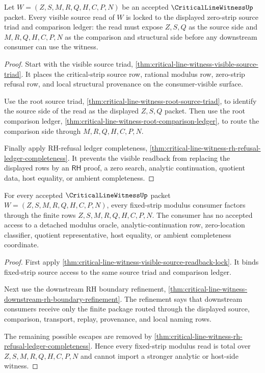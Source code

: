 \begin{theorem}
\label{thm:critical-line-witness-visible-source-readback-lock}
Let $W=(Z,S,M,R,Q,H,C,P,N)$ be an accepted $\CriticalLineWitnessUp$ packet. Every visible source read of $W$ is locked to the displayed zero-strip source triad and comparison ledger: the read must expose $Z,S,Q$ as the source side and $M,R,Q,H,C,P,N$ as the comparison and structural side before any downstream consumer can use the witness.
\end{theorem}
\begin{proof}
Start with the visible source triad, \autoref{thm:critical-line-witness-visible-source-triad}. It places the critical-strip source row, rational modulus row, zero-strip refusal row, and local structural provenance on the consumer-visible surface.

Use the root source triad, \autoref{thm:critical-line-witness-root-source-triad}, to identify the source side of the read as the displayed $Z,S,Q$ packet. Then use the root comparison ledger, \autoref{thm:critical-line-witness-root-comparison-ledger}, to route the comparison side through $M,R,Q,H,C,P,N$.

Finally apply RH-refusal ledger completeness, \autoref{thm:critical-line-witness-rh-refusal-ledger-completeness}. It prevents the visible readback from replacing the displayed rows by an $\mathsf{RH}$ proof, a zero search, analytic continuation, quotient data, host equality, or ambient completeness.
\end{proof}

\begin{theorem}
\label{thm:critical-line-witness-fixed-strip-modulus-totality}
For every accepted $\CriticalLineWitnessUp$ packet $W=(Z,S,M,R,Q,H,C,P,N)$, every fixed-strip modulus consumer factors through the finite rows $Z,S,M,R,Q,H,C,P,N$. The consumer has no accepted access to a detached modulus oracle, analytic-continuation row, zero-location classifier, quotient representative, host equality, or ambient completeness coordinate.
\end{theorem}
\begin{proof}
First apply \autoref{thm:critical-line-witness-visible-source-readback-lock}. It binds fixed-strip source access to the same source triad and comparison ledger.

Next use the downstream RH boundary refinement, \autoref{thm:critical-line-witness-downstream-rh-boundary-refinement}. The refinement says that downstream consumers receive only the finite package routed through the displayed source, comparison, transport, replay, provenance, and local naming rows.

The remaining possible escapes are removed by \autoref{thm:critical-line-witness-rh-refusal-ledger-completeness}. Hence every fixed-strip modulus read is total over $Z,S,M,R,Q,H,C,P,N$ and cannot import a stronger analytic or host-side witness.
\end{proof}

